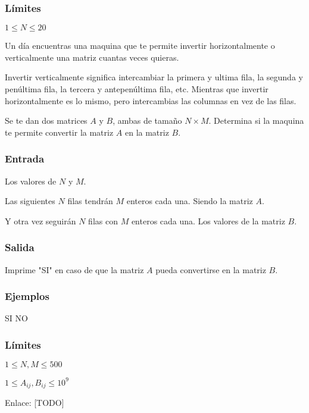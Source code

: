 \subsubsection*{Límites}
\begin{plimits}
	\item \(1\leq N \leq 20\)
\end{plimits}

\problembreak

\problemtitle  Un día encuentras una maquina que te permite invertir horizontalmente o verticalmente una matriz cuantas veces quieras. 

Invertir verticalmente significa intercambiar la primera y ultima fila, la segunda y penúltima fila, la tercera y antepenúltima fila, etc. Mientras que invertir horizontalmente es lo mismo, pero intercambias las columnas en vez de las filas.

Se te dan dos matrices \(A\) y \(B\), ambas de tamaño \(N\times M\). Determina si la maquina te permite convertir la matriz \(A\) en la matriz \(B\).

\subsubsection*{Entrada}
Los valores de \(N\) y \(M\).

Las siguientes \(N\) filas tendrán \(M\) enteros cada una. Siendo la matriz \(A\).

Y otra vez seguirán \(N\) filas con \(M\) enteros cada una. Los valores de la matriz \(B\). 

\subsubsection*{Salida}
Imprime "SI" en caso de que la matriz \(A\) pueda convertirse en la matriz \(B\).

\subsubsection*{Ejemplos}
\begin{casebox2}
	{SI}	
	 {NO}
\end{casebox2}

\subsubsection*{Límites}

\begin{plimits}
	\item \(1\leq N,M\leq 500 \)
	\item \(1\leq A_{ij}, B_{ij}\leq 10^9 \)
\end{plimits}

Enlace: [TODO]
